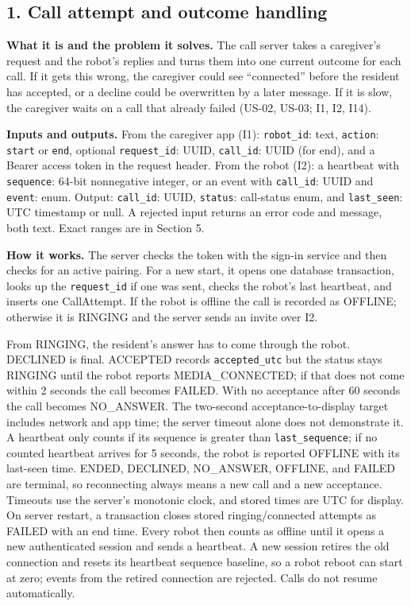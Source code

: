 \documentclass[12pt,letterpaper]{article}
\newcommand{\field}[1]{\texttt{#1}}
\begin{document}
\subsection*{1. Call attempt and outcome handling}

\textbf{What it is and the problem it solves.} The call server takes a caregiver's request and the robot's replies and turns them into one current outcome for each call. If it gets this wrong, the caregiver could see ``connected'' before the resident has accepted, or a decline could be overwritten by a later message. If it is slow, the caregiver waits on a call that already failed (US-02, US-03; I1, I2, I14).

\textbf{Inputs and outputs.} From the caregiver app (I1): \field{robot\_id}: text, \field{action}: \field{start} or \field{end}, optional \field{request\_id}: UUID, \field{call\_id}: UUID (for end), and a Bearer access token in the request header. From the robot (I2): a heartbeat with \field{sequence}: 64-bit nonnegative integer, or an event with \field{call\_id}: UUID and \field{event}: enum. Output: \field{call\_id}: UUID, \field{status}: call-status enum, and \field{last\_seen}: UTC timestamp or null. A rejected input returns an error code and message, both text. Exact ranges are in Section 5.

\textbf{How it works.} The server checks the token with the sign-in service and then checks for an active pairing. For a new start, it opens one database transaction, looks up the \field{request\_id} if one was sent, checks the robot's last heartbeat, and inserts one CallAttempt. If the robot is offline the call is recorded as OFFLINE; otherwise it is RINGING and the server sends an invite over I2.

From RINGING, the resident's answer has to come through the robot. DECLINED is final. ACCEPTED records \field{accepted\_utc} but the status stays RINGING until the robot reports MEDIA\_CONNECTED; if that does not come within 2 seconds the call becomes FAILED. With no acceptance after 60 seconds the call becomes NO\_ANSWER. The two-second acceptance-to-display target includes network and app time; the server timeout alone does not demonstrate it. A heartbeat only counts if its sequence is greater than \field{last\_sequence}; if no counted heartbeat arrives for 5 seconds, the robot is reported OFFLINE with its last-seen time. ENDED, DECLINED, NO\_ANSWER, OFFLINE, and FAILED are terminal, so reconnecting always means a new call and a new acceptance. Timeouts use the server's monotonic clock, and stored times are UTC for display. On server restart, a transaction closes stored ringing/connected attempts as FAILED with an end time. Every robot then counts as offline until it opens a new authenticated session and sends a heartbeat. A new session retires the old connection and resets its heartbeat sequence baseline, so a robot reboot can start at zero; events from the retired connection are rejected. Calls do not resume automatically.
\end{document}
